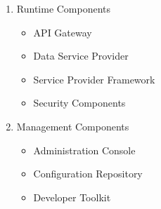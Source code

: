 \begin{enumerate}
    \item Runtime Components
    \begin{itemize}
        \item API Gateway
        \item Data Service Provider
        \item Service Provider Framework
        \item Security Components
    \end{itemize}
    \item Management Components
    \begin{itemize}
        \item Administration Console
        \item Configuration Repository
        \item Developer Toolkit
    \end{itemize}
\end{enumerate} \autocite{IBM2023a}

